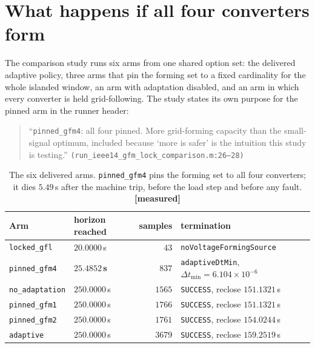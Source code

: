 \documentclass[12pt,a4paper]{article}
\theoremstyle{remark}
\newcommand{\code}[1]{\texttt{\small #1}}
\newcommand{\measured}{\textcolor{ok}{\textbf{[measured]}}}
\begin{document}
\section{What happens if all four converters form}\label{sec:allfour}

The comparison study runs six arms from one shared option set: the delivered
adaptive policy, three arms that pin the forming set to a fixed cardinality for
the whole islanded window, an arm with adaptation disabled, and an arm in which
every converter is held grid-following. The study states its own purpose for the
pinned arm in the runner header:

\begin{quote}\small
``\code{pinned\_gfm4}: all four pinned. More grid-forming capacity than the
small-signal optimum, included because `more is safer' is the intuition this
study is testing.''
\code{\hfill(run\_ieee14\_gfm\_lock\_comparison.m:26--28)}
\end{quote}

\begin{table}[H]
\centering
\small
\begin{tabular}{@{}llrl@{}}
\toprule
\textbf{Arm} & \textbf{horizon reached} & \textbf{samples} & \textbf{termination}\\
\midrule
\code{locked\_gfl}     & $20.0000$\,s & $43$       & \code{noVoltageFormingSource}\\
\code{pinned\_gfm4}    & $\mathbf{25.4852}$\,\textbf{s} & $837$ & \code{adaptiveDtMin}, $\Delta t_{\min}=6.104\times10^{-6}$\\
\code{no\_adaptation}  & $250.0000$\,s & $1565$   & \code{SUCCESS}, reclose $151.1321$\,s\\
\code{pinned\_gfm1}    & $250.0000$\,s & $1766$   & \code{SUCCESS}, reclose $151.1321$\,s\\
\code{pinned\_gfm2}    & $250.0000$\,s & $1761$   & \code{SUCCESS}, reclose $154.0244$\,s\\
\code{adaptive}        & $250.0000$\,s & $3679$   & \code{SUCCESS}, reclose $159.2519$\,s\\
\bottomrule
\end{tabular}
\caption{The six delivered arms. \code{pinned\_gfm4} pins the forming set to all
four converters; it dies $5.49$\,s after the machine trip, before the load step
and before any fault. \measured}
\label{tab:armcmp}
\end{table}
\end{document}
